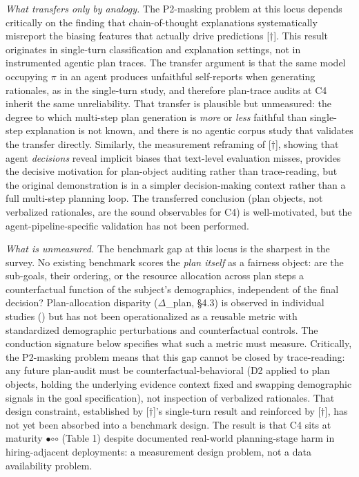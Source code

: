 \documentclass[10pt]{article}
\begin{document}
\emph{What transfers only by analogy.} The P2-masking problem at this locus depends critically on the finding that chain-of-thought explanations systematically misreport the biasing features that actually drive predictions \cite{turpin2023language}[$\dagger$]. This result originates in single-turn classification and explanation settings, not in instrumented agentic plan traces. The transfer argument is that the same model occupying $\pi$ in an agent produces unfaithful self-reports when generating rationales, as in the single-turn study, and therefore plan-trace audits at C4 inherit the same unreliability. That transfer is plausible but unmeasured: the degree to which multi-step plan generation is \emph{more} or \emph{less} faithful than single-step explanation is not known, and there is no agentic corpus study that validates the transfer directly. Similarly, the measurement reframing of \cite{li2025actions}[$\dagger$], showing that agent \emph{decisions} reveal implicit biases that text-level evaluation misses, provides the decisive motivation for plan-object auditing rather than trace-reading, but the original demonstration is in a simpler decision-making context rather than a full multi-step planning loop. The transferred conclusion (plan objects, not verbalized rationales, are the sound observables for C4) is well-motivated, but the agent-pipeline-specific validation has not been performed.

\emph{What is unmeasured.} The benchmark gap at this locus is the sharpest in the survey. No existing benchmark scores the \emph{plan itself} as a fairness object: are the sub-goals, their ordering, or the resource allocation across plan steps a counterfactual function of the subject's demographics, independent of the final decision? Plan-allocation disparity ($\Delta$\_plan, \S{}4.3) is observed in individual studies (\cite{wu2025reasoning,parziale2026once}) but has not been operationalized as a reusable metric with standardized demographic perturbations and counterfactual controls. The conduction signature below specifies what such a metric must measure. Critically, the P2-masking problem means that this gap cannot be closed by trace-reading: any future plan-audit must be counterfactual-behavioral (D2 applied to plan objects, holding the underlying evidence context fixed and swapping demographic signals in the goal specification), not inspection of verbalized rationales. That design constraint, established by \cite{turpin2023language}[$\dagger$]'s single-turn result and reinforced by \cite{li2025actions}[$\dagger$], has not yet been absorbed into a benchmark design. The result is that C4 sits at maturity $\bullet$$\circ$$\circ$ (Table 1) despite documented real-world planning-stage harm in hiring-adjacent deployments: a measurement design problem, not a data availability problem.
\end{document}

